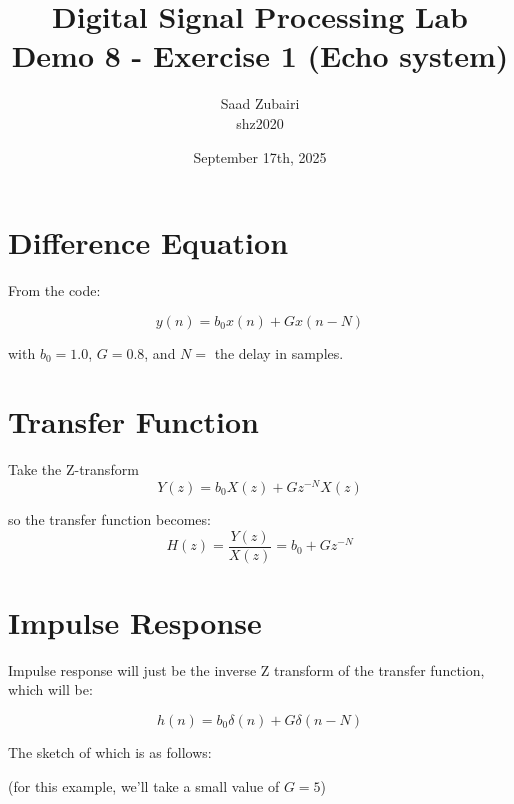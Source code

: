 \documentclass[11pt]{article}
\title{
    \vspace{3em}
    \textbf{Digital Signal Processing Lab}\\
    Demo 8 - Exercise 1 (Echo system)
    \vspace{1em}
}
\author{
    Saad Zubairi \\ 
    shz2020 \\
    \vspace{1em}
}
\date{September 17th, 2025}
\begin{document}
\maketitle	

\pagebreak



\section{Difference Equation}

From the code:

$$
y(n)= b_{0}x(n) + Gx(n-N)
$$

with $b_{0} = 1.0$, $G=0.8$, and $ N =$ the delay in samples.

\section{Transfer Function}

Take the Z-transform
$$
Y(z)= b_{0}X(z) + Gz^{-N}X(z)
$$

so the transfer function becomes:
$$
H(z)=\frac{Y(z)}{X(z)}= b_{0} + Gz^{-N}
$$

\section{Impulse Response}
Impulse response will just be the inverse Z transform of the transfer function, which will be:

$$
h(n)= b_{0}\delta(n) + G\delta(n-N)
$$

The sketch of which is as follows:

(for this example, we'll take a small value of $G=5$)

\bigskip
{}
\end{document}

